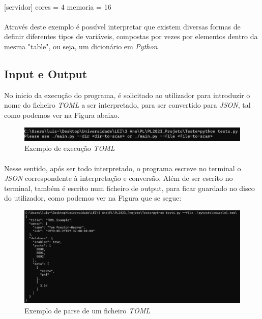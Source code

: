 \documentclass[a4paper]{report}
\begin{document}
\paragraph{}
[servidor]
cores = 4
memoria = 16
\paragraph{}
Através deste exemplo é possível interpretar que existem diversas formas de definir diferentes tipos de variáveis, compostas por vezes por elementos dentro da mesma "table", ou seja, um dicionário em \textit{Python}

\subsection{Input e Output}
No inicio da execução do programa, é solicitado ao utilizador para introduzir o nome do ficheiro \textit{TOML} a ser interpretado, para ser convertido para \textit{JSON}, tal como podemos ver na Figura abaixo.
\begin{figure}[H]
    \centering
    \includegraphics[scale=0.7]{imagens/ExecucaoRequirements.png}
    \caption{Exemplo de execução \textit{TOML}}
    \label{fig:my_label}
\end{figure}


\paragraph{}
Nesse sentido, após ser todo interpretado, o programa escreve no terminal o \textit{JSON} correspondente à interpretação e conversão. Além de ser escrito no terminal, também é escrito num ficheiro de output, para ficar guardado no disco do utilizador, como podemos ver na Figura que se segue:

\begin{figure}[H]
    \centering
    \includegraphics[scale=0.4]{imagens/ExemploParsed.png}
    \caption{Exemplo de parse de um ficheiro \textit{TOML}}
    \label{fig:my_label}
\end{figure}
\end{document}

